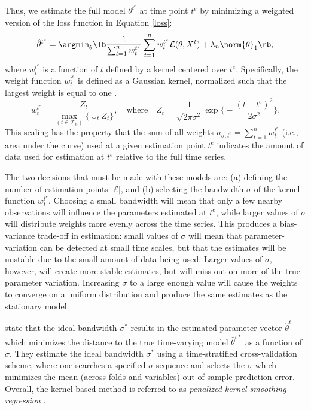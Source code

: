 Thus, we estimate the full model $\theta^{t^e}$ at time point $t^e$ by minimizing a weighted version of the loss function in Equation \ref{loss}:
\begin{equation}
    \hat{\theta}^{t^e} = \argmin_{\theta} \lb \frac{1}{\sum_{t=1}^n w_{t}^{t^e}} \sum_{t=1}^n w_{t}^{t^e} \mathcal{L}(\theta, X^t) + \lambda_n \norm{\theta}_1 \rb, 
\end{equation}
where $w_{t}^{t^e}$ is a function of $t$ defined by a kernel centered over $t^e$. Specifically, the weight function $w_{t}^{t^e}$ is defined as a Gaussian kernel, normalized such that the largest weight is equal to one \cite{zhou2010time}.
\begin{equation}
    w_{t}^{t^e} = \frac{Z_t}{\max_{(t \in \mathcal{T}_n)} \{ \cup_t Z_t \}}, \quad \text{where} \quad Z_t = \frac{1}{\sqrt{2 \pi \sigma^2}} \exp{\bigg\{ - \frac{(t - t^e)^2}{2 \sigma^2} \bigg\}}.
\end{equation}
This scaling has the property that the sum of all weights $n_{\sigma, t^e} = \sum_{t=1}^n w_{t}^{t^e}$ (i.e., area under the curve) used at a given estimation point $t^e$ indicates the amount of data used for estimation at $t^e$ relative to the full time series.

The two decisions that must be made with these models are: (a) defining the number of estimation points $|\mathcal{E}|$, and (b) selecting the bandwidth $\sigma$ of the kernel function $w_{t}^{t^e}$. Choosing a small bandwidth will mean that only a few nearby observations will influence the parameters estimated at $t^e$, while larger values of $\sigma$ will distribute weights more evenly across the time series. This produces a bias-variance trade-off in estimation: small values of $\sigma$ will mean that parameter-variation can be detected at small time scales, but that the estimates will be unstable due to the small amount of data being used. Larger values of $\sigma$, however, will create more stable estimates, but will miss out on more of the true parameter variation. Increasing $\sigma$ to a large enough value will cause the weights to converge on a uniform distribution and produce the same estimates as the stationary model. 

\cite{haslbeck2015mgm} state that the ideal bandwidth $\sigma^*$ results in the estimated parameter vector $\hat{\theta}^{t}$ which minimizes the distance to the true time-varying model $\hat{\theta}^{t*}$ as a function of $\sigma$. They estimate the ideal bandwidth $\sigma^*$ using a time-stratified cross-validation scheme, where one searches a specified $\sigma$-sequence and selects the $\sigma$ which minimizes the mean (across folds and variables) out-of-sample prediction error. Overall, the kernel-based method is referred to as \textit{penalized kernel-smoothing regression} \cite{haslbeck2017estimate}.

